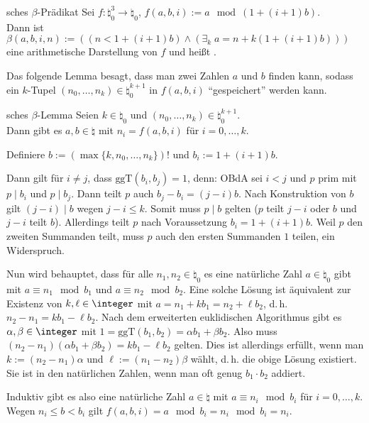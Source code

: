\linie
\pagebreak

\begin{Def}{sches $\beta$-Prädikat}
    Sei $f\colon \natural_0^3 \rightarrow \natural_0$,
    $f(a, b, i) := a \mod (1 + (i + 1)b)$.\\
    Dann ist
    $\beta(a, b, i, n) := ((n < 1 + (i + 1)b) \land (\exists_k\; a = n + k(1 + (i + 1)b)))$
    eine arithmetische Darstellung von $f$ und heißt .
\end{Def}

\begin{Bem}
    Das folgende Lemma besagt, dass man zwei Zahlen $a$ und $b$ finden kann, sodass
    ein $k$-Tupel $(n_0, \dotsc, n_k) \in \natural_0^{k+1}$ in $f(a, b, i)$
    "`gespeichert"' werden kann.
\end{Bem}

\begin{Lemma}{sches $\beta$-Lemma}
    Seien $k \in \natural_0$ und $(n_0, \dotsc, n_k) \in \natural_0^{k+1}$.\\
    Dann gibt es $a, b \in \natural$ mit $n_i = f(a, b, i)$ für $i = 0, \dotsc, k$.
\end{Lemma}

\begin{Beweis}
    Definiere $b := (\max\{k, n_0, \dotsc, n_k\})!$ und $b_i := 1 + (i + 1)b$.
    
    Dann gilt für $i \not= j$, dass $\text{ggT}(b_i, b_j) = 1$, denn:
    OBdA sei $i < j$ und $p$ prim mit $p \;|\; b_i$ und $p \;|\; b_j$.
    Dann teilt $p$ auch $b_j - b_i = (j - i)b$.
    Nach Konstruktion von $b$ gilt $(j - i) \;|\; b$ wegen $j - i \le k$.
    Somit muss $p \;|\; b$ gelten ($p$ teilt $j - i$ oder $b$ und $j - i$ teilt $b$).
    Allerdings teilt $p$ nach Voraussetzung $b_i = 1 + (i + 1)b$.
    Weil $p$ den zweiten Summanden teilt, muss $p$ auch den ersten Summanden $1$ teilen,
    ein Widerspruch.
    
    Nun wird behauptet, dass für alle $n_1, n_2 \in \natural_0$ es eine natürliche Zahl
    $a \in \natural_0$ gibt mit $a \equiv n_1 \mod b_1$ und $a \equiv n_2 \mod b_2$.
    Eine solche Lösung ist äquivalent zur Existenz von
    $k, \ell \in \integer$ mit $a = n_1 + kb_1 = n_2 + \ell b_2$,
    d.\,h. $n_2 - n_1 = kb_1 - \ell b_2$.
    Nach dem erweiterten euklidischen Algorithmus gibt es $\alpha, \beta \in \integer$ mit
    $1 = \text{ggT}(b_1, b_2) = \alpha b_1 + \beta b_2$.
    Also muss $(n_2 - n_1)(\alpha b_1 + \beta b_2) = kb_1 - \ell b_2$ gelten.
    Dies ist allerdings erfüllt, wenn man $k := (n_2 - n_1)\alpha$ und $\ell := (n_1 - n_2)\beta$
    wählt, d.\,h. die obige Lösung existiert.
    Sie ist in den natürlichen Zahlen, wenn man oft genug $b_1 \cdot b_2$ addiert.
    
    Induktiv gibt es also eine natürliche Zahl $a \in \natural$ mit
    $a \equiv n_i \mod b_i$ für $i = 0, \dotsc, k$.
    Wegen $n_i \le b < b_i$ gilt $f(a, b, i) = a \mod b_i = n_i \mod b_i = n_i$.
\end{Beweis}

